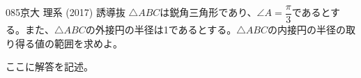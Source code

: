 \begin{thm}{085}{}{京大 理系 (2017) 誘導抜}
 $\triangle{ABC}$は鋭角三角形であり、$\angle{A}=\dfrac{\pi}{3}$であるとする。また、$\triangle{ABC}$の外接円の半径は1であるとする。$\triangle{ABC}$の内接円の半径の取り得る値の範囲を求めよ。
\end{thm}

ここに解答を記述。